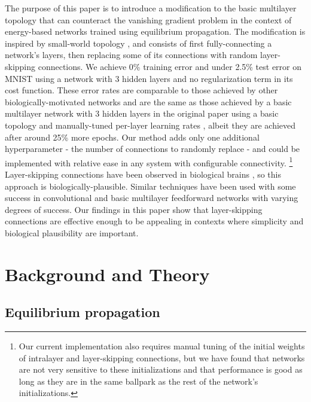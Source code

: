 \documentclass[format=sigconf]{acmart}
\begin{document}
The purpose of this paper is to introduce a modification to the basic multilayer topology that can counteract the vanishing gradient problem in the context of energy-based networks trained using equilibrium propagation. The modification is inspired by small-world topology \cite{watts98}, and consists of first fully-connecting a network's layers, then replacing some of its connections with random layer-skipping connections. We achieve 0\% training error and under 2.5\% test error on MNIST using a network with 3 hidden layers and no regularization term in its cost function. These error rates are comparable to those achieved by other biologically-motivated networks \cite{bartunov2018} and are the same as those achieved by a basic multilayer network with 3 hidden layers in the original paper using a basic topology and manually-tuned per-layer learning rates \cite{scellier17}, albeit they are achieved after around 25\% more epochs. Our method adds only one additional hyperparameter - the number of connections to randomly replace - and could be implemented with relative ease in any system with configurable connectivity.
\footnote{Our current implementation also requires manual tuning of the initial weights of intralayer and layer-skipping connections, but we have found that networks are not very sensitive to these initializations and that performance is good as long as they are in the same ballpark as the rest of the network's initializations.} Layer-skipping connections have been observed in biological brains \cite{bullmore2009}, so this approach is biologically-plausible. Similar techniques have been used with some success in convolutional \cite{he2015, srivastava2015} and basic multilayer feedforward \cite{xiaohu2011, krishnan2019} networks with varying degrees of success. Our findings in this paper show that layer-skipping connections are effective enough to be appealing in contexts where simplicity and biological plausibility are important.


\section{Background and Theory}

\subsection{Equilibrium propagation}
\label{sec:eqp_formulation}
\end{document}
